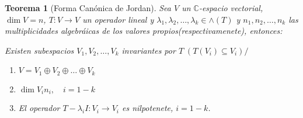 \documentclass[10pt,a4paper]{article}
\newtheorem{mytheo}{Teorema}
\begin{document}
\begin{mytheo}[Forma Canónica de Jordan]
	Sea $V$ un $\mathbb{C}$-espacio vectorial, $\dim V = n$, $T:V\rightarrow V$ un operador lineal y $\lambda_{1},\lambda_{2},\ldots,\lambda_{k}\in \wedge (T)$ y $n_{1}, n_{2},\ldots , n_{k}$ las multiplicidades algebráicas de los valores propios(respectivamenete), entonces:

Existen subespacios $V_{1}, V_{2},\ldots, V_{k}$ invariantes por $T\;\left(T(V_{i})\subseteq V_{i}\right)/$
\begin{enumerate}
	\item	$V = V_{1}\oplus V_{2}\oplus\ldots\oplus V_{k}$
	\item $\dim V_{i} n_{i},\quad i=1-k$
	\item El operador $T-\lambda_{i}I:V_{i}\rightarrow V_{i}$ es nilpotenete, $i=1-k$.
\end{enumerate}
\end{mytheo}
\end{document}
